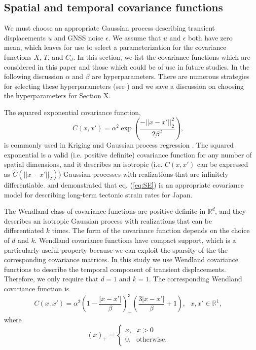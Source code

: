 \documentclass[10pt,a4paper]{article}
\begin{document}
\subsection{Spatial and temporal covariance functions}
We must choose an appropriate Gaussian process describing transient displacements $u$ and GNSS noise $\epsilon$. We assume that $u$ and $\epsilon$ both have zero mean, which leaves for use to select a parameterization for the covariance functions $X$, $T$, and $C_d$.  In this section, we list the covariance functions which are considered in this paper and those which could be of use in future studies. In the following discussion $\alpha$ and $\beta$ are hyperparameters. There are numerous strategies for selecting these hyperparameters (see \citet{Cressie1992}) and we save a discussion on choosing the hyperparameters for Section X.

The squared exponential covariance function,
\begin{equation}\label{eq:SE}
C(x,x') = \alpha^2 \exp\left(\frac{-||x - x'||_2^2}{2 \beta^2}\right),
\end{equation}
is commonly used in Kriging \citep[e.g,][]{Cressie1992} and Gaussian process regression \citep[e.g.,][]{Rasmussen2006}.  The squared exponential is a valid (i.e. positive definite) covariance function for any number of spatial dimensions, and it describes an isotropic (i.e. $C(x,x')$ can be expressed as $\hat{C}(||x - x'||_2)$) Gaussian processes with realizations that are infinitely differentiable.  \citet{Kato1998} and \cite{El-Fiky1999} demonstrated that eq. (\ref{eq:SE}) is an appropriate covariance model for describing long-term tectonic strain rates for Japan.  

The Wendland class of covariance functions \citep{Wendland2005} are positive definite in $\mathbb{R}^d$, and they describes an isotropic Gaussian process with realizations that can be differentiated $k$ times. The form of the covariance function depends on the choice of $d$ and $k$. Wendland covariance functions have compact support, which is a particularly useful property because we can exploit the sparsity of the the corresponding covariance matrices. In this study we use Wendland covariance functions to describe the temporal component of transient displacements. Therefore, we only require that $d=1$ and $k=1$. The corresponding Wendland covariance function is 
\begin{equation}\label{eq:Wendland}
C(x,x') = \alpha^2\left(1 - \frac{|x - x'|}{\beta}\right)^3_+ \left(\frac{3|x - x'|}{\beta} + 1\right), \ \ \ x,x' \in \mathbb{R}^1,
\end{equation}
where
\begin{equation}
(x)_+ = 
\begin{cases}
x, \ \ \ x > 0 \\
0, \ \ \ \mathrm{otherwise}.
\end{cases}
\end{equation}
\end{document}
